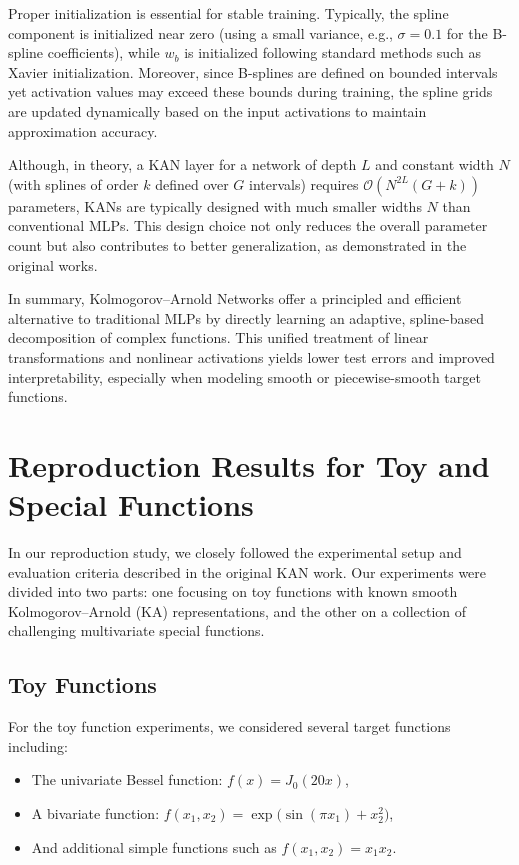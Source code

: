 \documentclass[conference]{IEEEtran}
\begin{document}
Proper initialization is essential for stable training. Typically, the spline
component is initialized near zero (using a small variance, e.g.,
\(\sigma=0.1\) for the B-spline coefficients), while \(w_b\) is initialized
following standard methods such as Xavier initialization. Moreover, since
B-splines are defined on bounded intervals yet activation values may exceed
these bounds during training, the spline grids are updated dynamically based on
the input activations to maintain approximation accuracy.

Although, in theory, a KAN layer for a network of depth \(L\) and constant
width \(N\) (with splines of order \(k\) defined over \(G\) intervals) requires
\(\mathcal{O}(N^{2L}(G+k))\) parameters, KANs are typically designed with much
smaller widths \(N\) than conventional MLPs. This design choice not only
reduces the overall parameter count but also contributes to better
generalization, as demonstrated in the original works.

In summary, Kolmogorov–Arnold Networks offer a principled and efficient
alternative to traditional MLPs by directly learning an adaptive, spline-based
decomposition of complex functions. This unified treatment of linear
transformations and nonlinear activations yields lower test errors and improved
interpretability, especially when modeling smooth or piecewise-smooth target
functions.

\section{Reproduction Results for Toy and Special Functions}

In our reproduction study, we closely followed the experimental setup and
evaluation criteria described in the original KAN work. Our experiments were
divided into two parts: one focusing on toy functions with known smooth
Kolmogorov–Arnold (KA) representations, and the other on a collection of
challenging multivariate special functions.

\subsection{Toy Functions}

For the toy function experiments, we considered several target functions
including:
\begin{itemize}
    \item The univariate Bessel function: \( f(x) = J_0(20x) \),
    \item A bivariate function: \( f(x_1,x_2) = \exp\bigl(\sin(\pi x_1) + x_2^2\bigr) \),
    \item And additional simple functions such as \( f(x_1,x_2) = x_1x_2 \).
\end{itemize}
\end{document}
